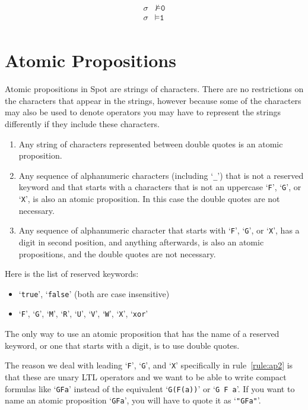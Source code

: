 \documentclass[a4paper,twoside,10pt,DIV=12]{scrreprt}
\newcommand{\0}{\texttt{0}}
\newcommand{\1}{\texttt{1}}
\newcommand\samp[1]{`\texttt{#1}'}
\begin{document}
\begin{align*}
  \sigma &\nvDash \0 \\
  \sigma &\vDash \1 \\
\end{align*}

\section{Atomic Propositions}\label{sec:ap}

Atomic propositions in Spot are strings of characters.  There are no
restrictions on the characters that appear in the strings, however
because some of the characters may also be used to denote operators
you may have to represent the strings differently if they include
these characters.

\begin{enumerate}
\item Any string of characters represented between double quotes is an
  atomic proposition.
\item Any sequence of alphanumeric characters \label{rule:ap2}
  (including \samp{\_}) that is not a reserved keyword and that starts
  with a characters that is not an uppercase \samp{F}, \samp{G}, or
  \samp{X}, is also an atomic proposition.  In this case the double
  quotes are not necessary.
\item \label{rule:ap3} Any sequence of alphanumeric character that
  starts with \samp{F}, \samp{G}, or \samp{X}, has a digit in second
  position, and anything afterwards, is also an atomic propositions,
  and the double quotes are not necessary.
\end{enumerate}

Here is the list of reserved keywords:
\begin{itemize}
\item \samp{true}, \samp{false}  (both are case insensitive)
\item \samp{F}, \samp{G}, \samp{M}, \samp{R}, \samp{U}, \samp{V},
  \samp{W}, \samp{X}, \samp{xor}
\end{itemize}

The only way to use an atomic proposition that has the name of a
reserved keyword, or one that starts with a digit, is to use double quotes.

The reason we deal with leading \samp{F}, \samp{G}, and \samp{X}
specifically in rule~\ref{rule:ap2} is that these are unary LTL
operators and we want to be able to write compact formulas like
\samp{GFa} instead of the equivalent \samp{G(F(a))} or
\samp{G~F~a}.  If you want to name an atomic proposition \samp{GFa},
you will have to quote it as \samp{"GFa"}.
\end{document}
